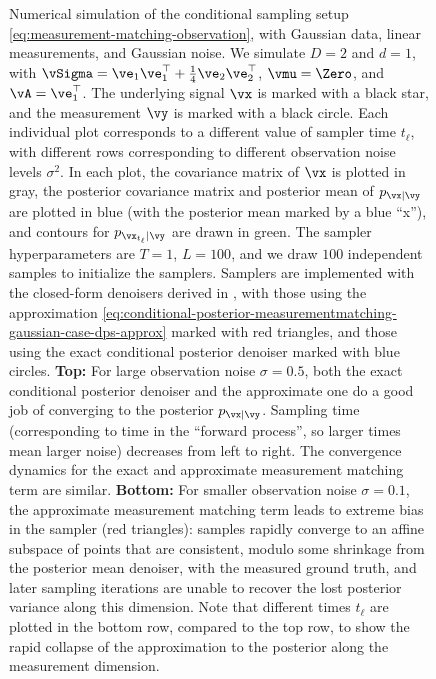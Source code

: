 \documentclass[../../book-main.tex]{subfiles}
\begin{document}
\begin{figure}[tbp]
    \caption{Numerical simulation of the conditional sampling setup
        \eqref{eq:measurement-matching-observation}, with Gaussian data, linear
        measurements, and Gaussian noise. We simulate $D=2$ and
        $d=1$, with $\vSigma
        = \ve_1 \ve_1^\top + \tfrac{1}{4} \ve_2 \ve_2^\top$, $\vmu = \Zero$, and
        $\vA = \ve_1^\top$. The underlying signal $\vx$ is marked
        with a black star,
        and the measurement $\vy$ is marked with a black circle.
        Each individual plot corresponds to a different value of sampler time
        $t_{\ell}$, with different rows corresponding to different
        observation noise
        levels $\sigma^2$.
        In each plot, the covariance matrix of $\vx$ is plotted in gray, the
        posterior covariance matrix and posterior mean of $p_{\vx \mid \vy}$ are
        plotted in blue (with the posterior mean marked by a blue ``x''), and
        contours for $p_{\vx_{t_{\ell}} \mid \vy}$ are drawn in
        green. The sampler
        hyperparameters are $T=1$, $L=100$, and we draw $100$
        independent samples to initialize the samplers. Samplers are implemented
        with the closed-form denoisers derived in
        , with those using the
        approximation
        \eqref{eq:conditional-posterior-measurementmatching-gaussian-case-dps-approx}
        marked with red triangles, and those using the exact
        conditional posterior
        denoiser marked with blue circles.
        \textbf{Top:} For large observation noise $\sigma = 0.5$, both the exact
        conditional posterior denoiser and the approximate one do a good job of
        converging to the posterior $p_{\vx \mid \vy}$. Sampling time
        (corresponding
        to time in the ``forward process'', so larger times mean larger noise)
        decreases from left to right.  The convergence dynamics for
        the exact and
        approximate measurement matching term are similar. \textbf{Bottom:} For
        smaller observation noise $\sigma = 0.1$, the
        approximate measurement matching term leads to extreme bias
        in the sampler
        (red triangles): samples rapidly converge to an affine subspace
        of points that are consistent, modulo some shrinkage from the
        posterior mean
        denoiser, with the measured ground truth, and later sampling
        iterations are
        unable to recover the lost posterior variance along this dimension. Note
        that different times $t_{\ell}$ are plotted in the bottom
        row, compared to
        the top row, to show the rapid collapse of the approximation to the
    posterior along the measurement dimension.}
    \label{fig:conditional_sampling_computational_gaussian}
\end{figure}
\end{document}
